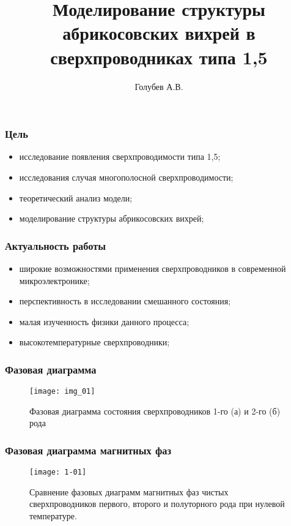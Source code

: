 \title{Моделирование структуры абрикосовских вихрей в сверхпроводниках 
    типа 1,5}
\author{Голубев А.В.}
\date{}

\begin{frame}
    \titlepage
\end{frame}

\begin{frame}
    \frametitle{Цель}
    \begin{itemize}
        \item исследование появления сверхпроводимости типа 1,5;
        \item исследования случая многополосной сверхпроводимости;
        \item теоретический анализ модели;
        \item моделирование структуры абрикосовских вихрей;
    \end{itemize}
\end{frame}

\begin{frame}
    \frametitle{Актуальность работы}
    \begin{itemize}
        \item широкие возможностями применения сверхпроводников в 
            современной микроэлектронике;
        \item перспективность в исследовании смешанного состояния;
        \item малая изученность физики данного процесса;
        \item высокотемпературные сверхпроводники;
    \end{itemize}
\end{frame}

\begin{frame}
    \frametitle{Фазовая диаграмма}
    \begin{figure}[h]
        \center
        \texttt{[image: img\_01]}
        \caption{Фазовая диаграмма состояния сверхпроводников 1-го (а) и 
            2-го (б) рода}
    \end{figure}
\end{frame}

\begin{frame}
    \frametitle{Фазовая диаграмма магнитных фаз}
    \begin{figure}[h]
        \center
        \texttt{[image: 1-01]}
        \caption{Сравнение фазовых диаграмм магнитных фаз чистых 
            сверхпроводников первого, второго и полуторного рода при нулевой 
            температуре.}
    \end{figure}
\end{frame}

